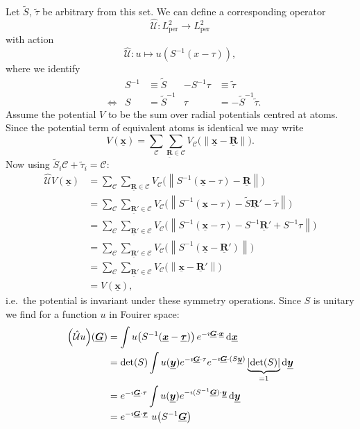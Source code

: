 \documentclass[a4paper]{article}
\newcommand{\D}{\mathop{}\!\mathrm{d}}
\newcommand{\I}{\ensuremath \imath}
\renewcommand*{\vec}[1]{\ensuremath{\underline{\boldsymbol{#1}}}}
\newcommand*{\Op}[1]{\ensuremath{\hat{\mathcal{#1}}}}
\newcommand*{\abs}[1]{\ensuremath{\left\lvert#1\right\rvert}}
\newcommand*{\norm}[1]{\ensuremath{\left\lVert#1\right\rVert}}
\begin{document}
Let $\tilde{S}$, $\tilde{\tau}$ be arbitrary from this set.
We can define a corresponding operator
\[ \Op{U} : L^2_\text{per} \to L^2_\text{per} \]
with action
\[
	\Op{U} : u \mapsto u\left( S^{-1} (x-\tau) \right),
\]
where we identify
\begin{align*}
	&& S^{-1} &\equiv \tilde{S} & -S^{-1}\tau &\equiv \tilde{\tau} \\
	&\Leftrightarrow &  S &= \tilde{S}^{-1} & \tau &= -\tilde{S}^{-1}\tilde{\tau}.
\end{align*}
Assume the potential $V$ to be the sum over radial potentials centred at atoms.
Since the potential term of equivalent atoms is identical we may write
\[
	V(\vec{x}) = \sum_{\mathcal{C}} \sum_{\vec{R} \in \mathcal{C}}
		V_{\mathcal{C}}\big(\norm{\vec{x} - \vec{R}}\big).
\]
Now using $\tilde{S}_i \mathcal{C} + \tilde{\tau}_i = \mathcal{C}$:
\begin{equation}
	\begin{aligned}
		\Op{U} V(\vec{x}) &= \sum_{\mathcal{C}} \sum_{\vec{R} \in \mathcal{C}}
			V_{\mathcal{C}}\big(\norm{S^{-1} (\vec{x} - \tau) - \vec{R}}\big) \\
		&= \sum_{\mathcal{C}} \sum_{\vec{R}' \in \mathcal{C}}
			V_{\mathcal{C}}\big(\norm{S^{-1} (\vec{x} - \tau) - \tilde{S}\vec{R}' - \tilde{\tau}}\big) \\
		&= \sum_{\mathcal{C}} \sum_{\vec{R}' \in \mathcal{C}}
		V_{\mathcal{C}}\big(\norm{S^{-1} (\vec{x} - \tau) - S^{-1}\vec{R}' + S^{-1} \tau}\big) \\
		&= \sum_{\mathcal{C}} \sum_{\vec{R}' \in \mathcal{C}}
		V_{\mathcal{C}}\big(\norm{S^{-1} (\vec{x} - \vec{R}')}\big) \\
		&= \sum_{\mathcal{C}} \sum_{\vec{R}' \in \mathcal{C}}
		V_{\mathcal{C}}\big(\norm{\vec{x} - \vec{R}'}\big) \\
		&= V(\vec{x}),
	\end{aligned}
	\label{eqn:Potential}
\end{equation}
i.e.~the potential is invariant under these symmetry operations.
Since $S$ is unitary we find for a function $u$ in Fouirer space:
\begin{equation}
\begin{aligned}
	\left( \Op{U} u \right)\!(\vec{G})
	&= \int u\!\left( S^{-1} (\vec{x} - \vec{\tau}) \right)
	e^{-\I \vec{G} \cdot \vec{x}} \D \vec{x}\\
	&= \det(S) \int u(\vec{y}) e^{-\I \vec{G} \cdot \tau}
	e^{-\I \vec{G} \cdot (S \vec{y})} \underbrace{\abs{\det(S)}}_{= 1} \D \vec{y} \\
	&= e^{-\I \vec{G} \cdot \tau} \int u(\vec{y})
	e^{-\I (S^{-1} \vec{G}) \cdot \vec{y}} \D \vec{y} \\
	&= e^{-\I \vec{G} \cdot \vec{\tau}}\  u\!\left( S^{-1} \vec{G} \right)
\end{aligned}
\label{eqn:ukFourier}
\end{equation}
\end{document}
